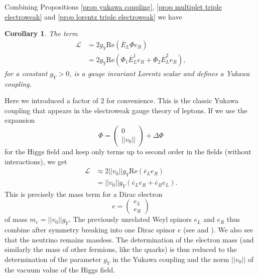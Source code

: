 \documentclass[11pt]{amsart}
\newtheorem{cor}[thm]{Corollary}
\theoremstyle{definition}
\theoremstyle{remark}
\numberwithin{equation}{section}
\begin{document}
Combining Propositions \ref{prop yukawa coupling}, \ref{prop multiplet triple electroweak} and \ref{prop lorentz triple electroweak} we have
\begin{cor}The term
\begin{align*}
\mathcal{L}&=2 g_Y\mathrm{Re}(\overline{E}_L\Phi e_R)\\
&=2g_Y\mathrm{Re}(\Phi_1\overline{E}^1_Le_R+\Phi_2\overline{E}^2_Le_R),
\end{align*}
for a constant $g_Y>0$, is a gauge invariant Lorentz scalar and defines a Yukawa coupling.
\end{cor}
Here we introduced a factor of $2$ for convenience. This is the classic Yukawa coupling that appears in the electroweak gauge theory of leptons. If we use the expansion
\begin{equation*}
\Phi=\left(\begin{array}{c} 0 \\ ||v_0|| \end{array}\right)+\Delta\Phi
\end{equation*}
for the Higgs field and keep only terms up to second order in the fields (without interactions), we get
\begin{align*}
\mathcal{L}&\approx 2||v_0||g_Y\mathrm{Re}(\overline{e}_Le_R)\\
&=||v_0||g_Y(\overline{e}_Le_R+\overline{e}_Re_L).
\end{align*}
This is precisely the mass term for a Dirac electron 
\begin{equation*}
e=\left(\begin{array}{c}e_L\\ e_R\end{array}\right)
\end{equation*}
of mass $m_e=||v_0||g_Y$. The previously unrelated Weyl spinors $e_L$ and $e_R$ thus combine after symmetry breaking into one Dirac spinor $e$ (see \cite{Robinson} and \cite{Srednicki}). We also see that the neutrino remains massless. The determination of the electron mass (and similarly the mass of other fermions, like the quarks) is thus reduced to the determination of the parameter $g_Y$ in the Yukawa coupling and the norm $||v_0||$ of the vacuum value of the Higgs field.
\end{document}
